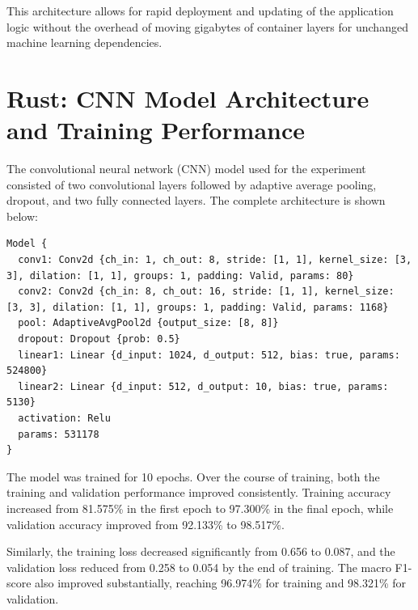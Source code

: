 \documentclass[11pt,a4paper]{article}
\begin{document}
This architecture allows for rapid deployment and updating of the application logic without the overhead of moving gigabytes of container layers for unchanged machine learning dependencies.

\section{Rust: CNN Model Architecture and Training Performance}

The convolutional neural network (CNN) model used for the experiment consisted of two convolutional layers followed by adaptive average pooling, dropout, and two fully connected layers. The complete architecture is shown below:

\begin{verbatim}
Model {
  conv1: Conv2d {ch_in: 1, ch_out: 8, stride: [1, 1], kernel_size: [3, 3], dilation: [1, 1], groups: 1, padding: Valid, params: 80}
  conv2: Conv2d {ch_in: 8, ch_out: 16, stride: [1, 1], kernel_size: [3, 3], dilation: [1, 1], groups: 1, padding: Valid, params: 1168}
  pool: AdaptiveAvgPool2d {output_size: [8, 8]}
  dropout: Dropout {prob: 0.5}
  linear1: Linear {d_input: 1024, d_output: 512, bias: true, params: 524800}
  linear2: Linear {d_input: 512, d_output: 10, bias: true, params: 5130}
  activation: Relu
  params: 531178
}
\end{verbatim}

The model was trained for 10 epochs. Over the course of training, both the training and validation performance improved consistently. Training accuracy increased from 81.575\% in the first epoch to 97.300\% in the final epoch, while validation accuracy improved from 92.133\% to 98.517\%.

Similarly, the training loss decreased significantly from 0.656 to 0.087, and the validation loss reduced from 0.258 to 0.054 by the end of training. The macro F1-score also improved substantially, reaching 96.974\% for training and 98.321\% for validation.
\end{document}

